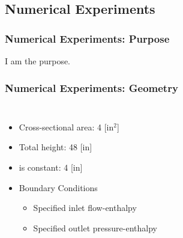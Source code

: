 \documentclass[compress,xcolor=table]{beamer}
\begin{document}
\subsection[Experiments]{Numerical Experiments}
\begin{frame}
\frametitle{Numerical Experiments: Purpose}

I am the purpose.

\end{frame}
\begin{frame}
\frametitle{Numerical Experiments: Geometry}
\begin{columns}

\begin{itemize}
\item{Cross-sectional area: 4 [in$^2$]}
\item{Total height: 48 [in]}
\item{\dx{} is constant: 4 [in]}
\item{ Boundary Conditions
	\begin{itemize}
	\item{Specified inlet flow-enthalpy}
	\item{Specified outlet pressure-enthalpy}
\end{itemize}
}
\end{itemize}

\begin{figure}[h!t]
\centering
{}
\end{figure}
\end{columns}
\end{frame}
\end{document}
